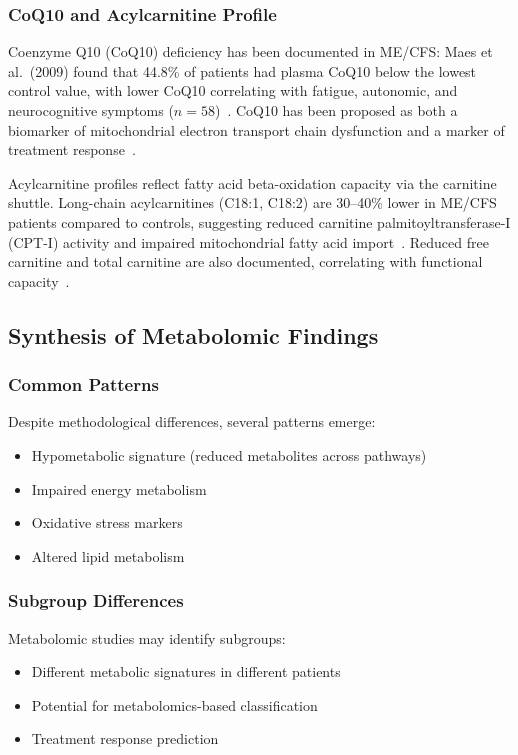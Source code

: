 \subsubsection{CoQ10 and Acylcarnitine Profile}

Coenzyme Q10 (CoQ10) deficiency has been documented in ME/CFS: Maes et al.\ (2009) found that 44.8\% of patients had plasma CoQ10 below the lowest control value, with lower CoQ10 correlating with fatigue, autonomic, and neurocognitive symptoms ($n = 58$)~\cite{Maes2009CoQ10}. CoQ10 has been proposed as both a biomarker of mitochondrial electron transport chain dysfunction and a marker of treatment response~\cite{CastroMarrero2021CoQ10}.

Acylcarnitine profiles reflect fatty acid beta-oxidation capacity via the carnitine shuttle. Long-chain acylcarnitines (C18:1, C18:2) are 30--40\% lower in ME/CFS patients compared to controls, suggesting reduced carnitine palmitoyltransferase-I (CPT-I) activity and impaired mitochondrial fatty acid import~\cite{Reuter2011}. Reduced free carnitine and total carnitine are also documented, correlating with functional capacity~\cite{Plioplys1995carnitine}.

\subsection{Synthesis of Metabolomic Findings}

\subsubsection{Common Patterns}
Despite methodological differences, several patterns emerge:
\begin{itemize}
    \item Hypometabolic signature (reduced metabolites across pathways)
    \item Impaired energy metabolism
    \item Oxidative stress markers
    \item Altered lipid metabolism
\end{itemize}

\subsubsection{Subgroup Differences}
Metabolomic studies may identify subgroups:
\begin{itemize}
    \item Different metabolic signatures in different patients
    \item Potential for metabolomics-based classification
    \item Treatment response prediction
\end{itemize}

